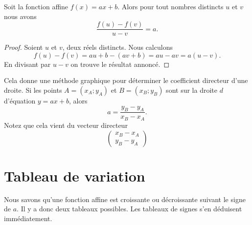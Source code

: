 \begin{theorem}
    Soit la fonction affine \( f(x)=ax+b\). Alors pour tout nombres distincts \( u\) et \( v\) nous avons
    \begin{equation}
        \frac{ f(u)-f(v) }{ u-v }=a.
    \end{equation}
\end{theorem}

\begin{proof}
    Soient \( u\) et \( v\), deux réels distincts. Nous calculons
    \begin{equation}
        f(u)-f(v)=au+b-(av+b)=au-av=a(u-v).
    \end{equation}
    En divisant par \( u-v\) on trouve le résultat annoncé.
\end{proof}

Cela donne une méthode graphique pour déterminer le coefficient directeur d'une droite. Si les points \( A=(x_A;y_A)\) et \( B=(x_B;y_B)\) sont sur la droite \( d\) d'équation \( y=ax+b\), alors
\begin{equation}
    a=\frac{ y_B-y_A }{ x_B-x_A }.
\end{equation}
Notez que cela vient du vecteur directeur
\begin{equation}
    \begin{pmatrix}
        x_B-x_A    \\ 
        y_B-y_A    
    \end{pmatrix}
\end{equation}

\section{Tableau de variation}

Nous savons qu'une fonction affine est croissante ou décroissante suivant le signe de \( a\). Il y a donc deux tableaux possibles. Les tableaux de signes s'en déduisent immédiatement.

